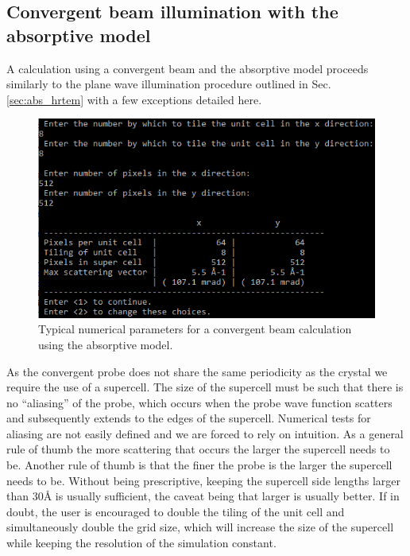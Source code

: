 \documentclass[12pt,a4paper]{article}
\begin{document}
\subsection{Convergent beam illumination with the absorptive model}
\label{abs_stem}

A calculation using a convergent beam and the absorptive model proceeds similarly to the plane wave illumination procedure outlined in Sec. \ref{sec:abs_hrtem} with a few exceptions detailed here.

\begin{figure}[!h]
\begin{center}
    \includegraphics[scale=0.75]{figures/cb_abs_numerical.png}
\caption{Typical numerical parameters for a convergent beam calculation using the absorptive model.}
\label{fig:cb_abs_numerical}
\end{center}
\end{figure}

As the convergent probe does not share the same periodicity as the crystal we require the use of a supercell.
The size of the supercell must be such that there is no ``aliasing'' of the probe, which occurs when the probe wave function scatters and subsequently extends to the edges of the supercell.
Numerical tests for aliasing are not easily defined and we are forced to rely on intuition.
As a general rule of thumb the more scattering that occurs the larger the supercell needs to be.
Another rule of thumb is that the finer the probe is the larger the supercell needs to be.
Without being prescriptive, keeping the supercell side lengths larger than 30{\AA} is usually sufficient, the caveat being that larger is usually better. 
If in doubt, the user is encouraged to double the tiling of the unit cell and simultaneously double the grid size, which will increase the size of the supercell while keeping the resolution of the simulation constant.
\end{document}
